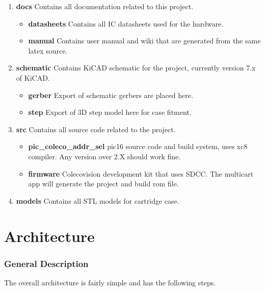 \documentclass{article}
\begin{document}
  \begin{enumerate}
    \item \textbf{docs} Contains all documentation related to this project.
      \begin{itemize}
        \item \textbf{datasheets} Contains all IC datasheets used for the hardware.
        \item \textbf{manual} Contains user manual and wiki that are generated from the same latex source.
      \end{itemize}
    \item \textbf{schematic} Contains KiCAD schematic for the project, currently version 7.x of KiCAD.
      \begin{itemize}
        \item \textbf{gerber} Export of schematic gerbers are placed here.
        \item \textbf{step} Export of 3D step model here for case fitment.
      \end{itemize}
    \item \textbf{src} Contains all source code related to the project.
      \begin{itemize}
        \item \textbf{pic\_coleco\_addr\_sel} pic16 source code and build system, uses xc8 compiler. Any version over 2.X should work fine.
        \item \textbf{firmware} Colecovision development kit that uses SDCC. The multicart app will generate the project and build rom file.
      \end{itemize}
    \item \textbf{models} Contains all STL models for cartridge case.
  \end{enumerate}

  \newpage

  \section{Architecture}
  \subsubsection{General Description}

  \par
  The overall architecture is fairly simple and has the following steps.
\end{document}
